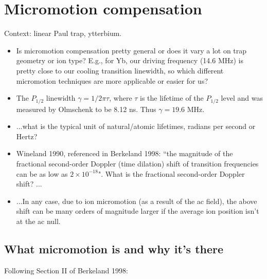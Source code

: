 \documentclass{article}
\begin{document}
\section*{Micromotion compensation}

Context: linear Paul trap, ytterbium. 

\begin{itemize}
\item Is micromotion compensation pretty general or does it vary a lot on trap geometry or ion type? E.g., for Yb, our driving frequency (14.6 MHz) is pretty close to our cooling transition linewidth, so which different micromotion techniques are more applicable or easier for us? 
\item The $P_{1/2}$ linewidth $\gamma = 1/2 \pi \tau$, where $\tau$ is the lifetime of the $P_{1/2}$ level and was measured by Olmschenk to be 8.12 ns. Thus $\gamma = 19.6$ MHz.
\item ...what is the typical unit of natural/atomic lifetimes, radians per second or Hertz?
\item Wineland 1990, referenced in Berkeland 1998: ``the magnitude of the fractional second-order Doppler (time dilation) shift of transition frequencies can be as low as $2 \times 10^{-18}$". What is the fractional second-order Doppler shift? ...
\item ...In any case, due to ion micromotion (as a result of the ac field), the above shift can be many orders of magnitude larger if the average ion position isn't at the ac null.
\end{itemize}


\subsection*{What micromotion is and why it's there}

Following Section II of Berkeland 1998:
\end{document}
